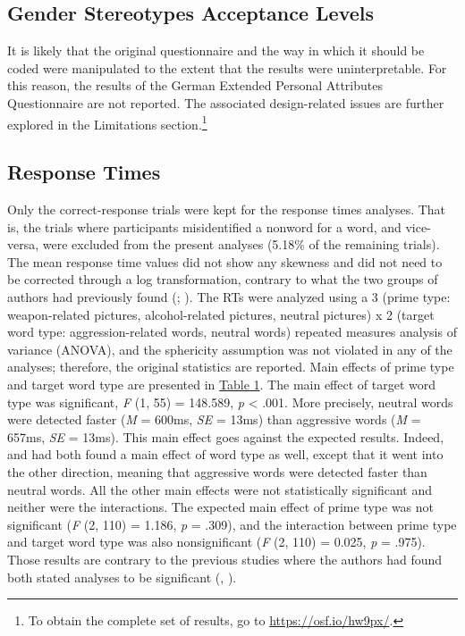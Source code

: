 \documentclass[serif, authorddate, twocolumn, empirical]{jote-article}
\begin{document}
{}
\subsection*{Gender Stereotypes Acceptance Levels}
It is likely that the original questionnaire and the way in which it should be coded were manipulated to the extent that the results were uninterpretable. For this reason, the results of the German Extended Personal Attributes Questionnaire are not reported. The associated design-related issues are further explored in the Limitations section.\footnote{ To obtain the complete set of results, go to \url{https://osf.io/hw9px/}.} 

{}
\subsection*{Response Times}
Only the correct-response trials were kept for the response times analyses. That is, the trials where participants misidentified a nonword for a word, and vice-versa, were excluded from the present analyses (5.18$\%$  of the remaining trials). The mean response time values did not show any skewness and did not need to be corrected through a log transformation, contrary to what the two groups of authors had previously found (\cite{BartholowHeinz2006}; \cite{SubraMullerBegueLBushmanDelmas2010}). The RTs were analyzed using a 3 (prime type: weapon-related pictures, alcohol-related pictures, neutral pictures) x 2 (target word type: aggression-related words, neutral words) repeated measures analysis of variance (ANOVA), and the sphericity assumption was not violated in any of the analyses; therefore, the original statistics are reported. Main effects of prime type and target word type are presented in \hyperlink{table1}{Table 1}. The main effect of target word type was significant, \textit{F }(1, 55) = 148.589, \textit{p }< .001. More precisely, neutral words were detected faster (\textit{M }= 600ms, \textit{SE }= 13ms) than aggressive words (\textit{M }= 657ms, \textit{SE }= 13ms). This main effect goes against the expected results. Indeed, \textcite{BartholowHeinz2006} and \textcite{SubraMullerBegueLBushmanDelmas2010} had both found a main effect of word type as well, except that it went into the other direction, meaning that aggressive words were detected faster than neutral words. All the other main effects were not statistically significant and neither were the interactions. The expected main effect of prime type was not significant (\textit{F} (2, 110) = 1.186, \textit{p }= .309), and the interaction between prime type and target word type was also nonsignificant (\textit{F }(2, 110) = 0.025, \textit{p }= .975). Those results are contrary to the previous studies where the authors had found both stated analyses to be significant (\cite{BartholowHeinz2006}, \cite{SubraMullerBegueLBushmanDelmas2010}).
\end{document}
